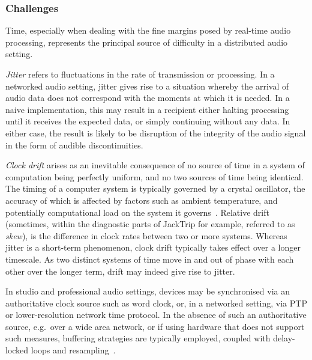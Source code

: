 \subsubsection{Challenges}\label{subsubsec:challenges}

Time, especially when dealing with the fine margins posed by real-time audio
processing, represents the principal source of difficulty in a distributed
audio setting.

\textit{Jitter} refers to fluctuations in the rate of transmission or
processing.
In a networked audio setting, jitter gives rise to a situation whereby the
arrival of audio data does not correspond with the moments at which it is
needed.
In a naive implementation, this may result in a recipient either halting
processing until it receives the expected data, or simply continuing without
any data.
In either case, the result is likely to be disruption of the integrity of the
audio signal in the form of audible discontinuities.

\textit{Clock drift} arises as an inevitable consequence of no source of time
in a system of computation being perfectly uniform, and no two sources of time
being identical.
The timing of a computer system is typically governed by a crystal oscillator,
the accuracy of which is affected by factors such as ambient temperature, and
potentially computational load on the system it
governs~\citep{marouani_internal_2008}.
Relative drift (sometimes, within the diagnostic parts of JackTrip for example,
referred to as \textit{skew}), is the difference in clock rates between two or
more systems.
Whereas jitter is a short-term phenomenon, clock drift typically takes effect
over a longer timescale.
As two distinct systems of time move in and out of phase with each other over
the longer term, drift may indeed give rise to jitter.

In studio and professional audio settings, devices may be synchronised via an
authoritative clock source such as word clock, or, in a networked setting,
via PTP or lower-resolution network time protocol.
In the absence of such an authoritative source, e.g.\ over a wide area network,
or if using hardware that does not support such measures, buffering strategies
are typically employed, coupled with delay-locked
loops and resampling~\citep{adriaensen_using_2005, adriaensen_controlling_2012}.
